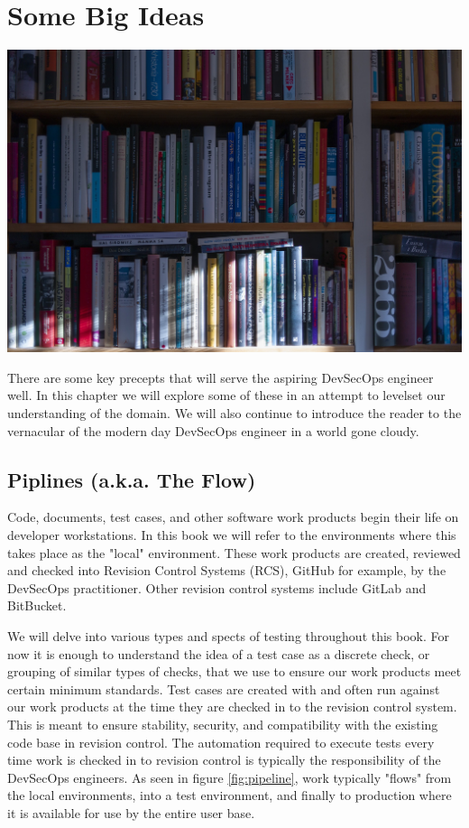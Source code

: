 \chapter{Some Big Ideas}

\includegraphics[scale=0.85]{../images/book-5104342_1920.jpg}

\justify
There are some key precepts that will serve the aspiring DevSecOps
engineer well. In this chapter we will explore some of these in
an attempt to levelset our understanding of the domain. We will also
continue to introduce the reader to the vernacular
of the modern day DevSecOps engineer in a world gone cloudy.

\section{Piplines (a.k.a. The Flow)}

\justify
Code, documents, test cases, and other software work products begin
their life on developer workstations. In this book we will refer to
the environments where this takes place as the "local" environment. 
These work products are created, reviewed and checked into Revision 
Control Systems (RCS), 
GitHub for example, by the DevSecOps practitioner. 
Other revision control systems include GitLab and 
BitBucket.

\justify
We will delve into various types and spects of testing 
throughout this book. For now it is enough to understand the idea of
a test case as a discrete check, or grouping of similar types of 
checks, that we use to ensure our work products meet certain minimum
standards.  Test cases are created with and often run against our
work products at the time they are checked in to the revision control
system. This is meant to ensure stability, security, and compatibility
with the existing code base in revision control. The automation required 
to execute tests every time work is checked in to revision control is 
typically the responsibility of the DevSecOps engineers. As seen in 
figure \ref{fig:pipeline}, work typically "flows" from the local environments, 
into a test environment, and finally to production where it is available 
for use by the entire user base.

